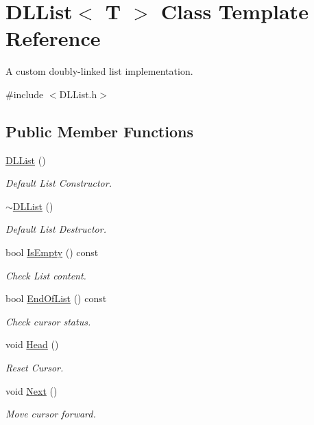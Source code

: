 \hypertarget{classDLList}{\section{D\-L\-List$<$ T $>$ Class Template Reference}
\label{classDLList}
}


A custom doubly-\/linked list implementation.  




{\ttfamily \#include $<$D\-L\-List.\-h$>$}

\subsection*{Public Member Functions}
\begin{DoxyCompactItemize}
\item 
\hyperlink{classDLList_a5b46ae51c7c8a8d80154116bff60f09f}{D\-L\-List} ()
\begin{DoxyCompactList}\small\item\em Default List Constructor. \end{DoxyCompactList}\item 
\hyperlink{classDLList_a09ac7185b3f16e504d8ebb70c45d729f}{$\sim$\-D\-L\-List} ()
\begin{DoxyCompactList}\small\item\em Default List Destructor. \end{DoxyCompactList}\item 
bool \hyperlink{classDLList_a2d99aa2cec84f17993ccdc3c7bca315d}{Is\-Empty} () const 
\begin{DoxyCompactList}\small\item\em Check List content. \end{DoxyCompactList}\item 
bool \hyperlink{classDLList_afda4c77170d81dc401f70e4762465d73}{End\-Of\-List} () const 
\begin{DoxyCompactList}\small\item\em Check cursor status. \end{DoxyCompactList}\item 
void \hyperlink{classDLList_a3b1136f4a0a80e441d9e3c9ce5e42653}{Head} ()
\begin{DoxyCompactList}\small\item\em Reset Cursor. \end{DoxyCompactList}\item 
void \hyperlink{classDLList_abab0ba485a340b9c89b66980b766d6a0}{Next} ()
\begin{DoxyCompactList}\small\item\em Move cursor forward. \end{DoxyCompactList}\item 

\end{DoxyCompactItemize}

